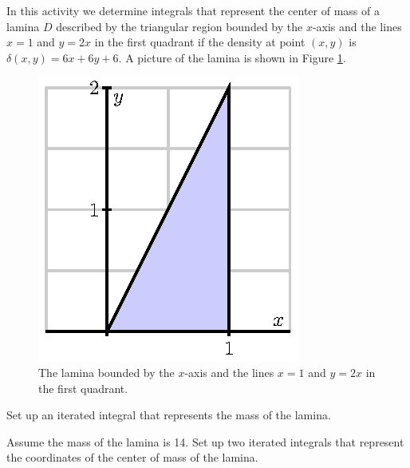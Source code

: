 \begin{activity} \label{A:11.4.4} In this activity we determine integrals that represent the center of mass of a lamina $D$ described by the triangular region bounded by the $x$-axis and the lines $x = 1$ and $y = 2x$ in the first quadrant if the density at point $(x, y)$ is $\delta(x, y) = 6x + 6y + 6$. A picture of the lamina is shown in Figure \ref{F:11.4.COM_ex_1}.
\begin{figure}[ht]
\begin{center}
  \includegraphics{figures/fig_11_4_triangle.eps}
\end{center}
\caption{The lamina bounded by the $x$-axis and the lines $x = 1$ and $y = 2x$ in the first quadrant.}
\label{F:11.4.COM_ex_1}
\end{figure}

    \ba
    \item Set up an iterated integral that represents the mass of the lamina.


    \item Assume the mass of the lamina is 14. Set up two iterated integrals that represent the coordinates of the center of mass of the lamina.


    \ea


\end{activity}
\begin{smallhint}

\end{smallhint}
\begin{bighint}

\end{bighint}
